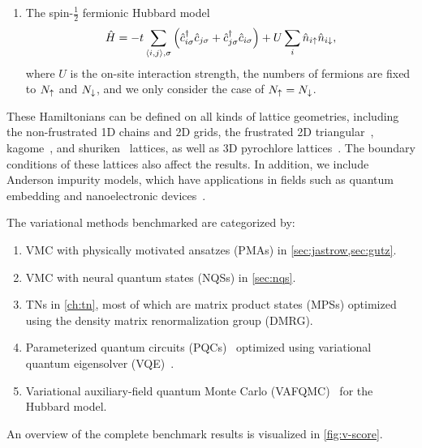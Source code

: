 \begin{enumerate}
\item The spin-$\frac{1}{2}$ fermionic Hubbard model
\begin{equation}
\hat{H} = -t \sum_{\langle i, j \rangle, \sigma} \left( \hat{c}^\dagger_{i \sigma} \hat{c}_{j \sigma} + \hat{c}^\dagger_{j \sigma} \hat{c}_{i \sigma} \right)
+ U \sum_i \hat{n}_{i {\uparrow}} \hat{n}_{i {\downarrow}},
\end{equation}
where $U$ is the on-site interaction strength, the numbers of fermions are fixed to $N_{\uparrow}$ and $N_{\downarrow}$, and we only consider the case of $N_{\uparrow} = N_{\downarrow}$.
\end{enumerate}
These Hamiltonians can be defined on all kinds of lattice geometries, including the non-frustrated 1D chains and 2D grids, the frustrated 2D triangular~\cite{li2015rare, liu2020intrinsic}, kagome~\cite{norman2016colloquium}, and shuriken~\cite{siddharthan2001square, astrakhantsev2021pinwheel} lattices, as well as 3D pyrochlore lattices~\cite{moessner1998properties, astrakhantsev2021broken}. The boundary conditions of these lattices also affect the results. In addition, we include Anderson impurity models, which have applications in fields such as quantum embedding and nanoelectronic devices~\cite{anderson1961localized, kanamori1963electron, lu2019natural, cao2021tree, cao2024vision}.

The variational methods benchmarked are categorized by:
\begin{enumerate}
\item VMC with physically motivated ansatzes (PMAs) in \cref{sec:jastrow,sec:gutz}.
\item VMC with neural quantum states (NQSs) in \cref{sec:nqs}.
\item TNs in \cref{ch:tn}, most of which are matrix product states (MPSs) optimized using the density matrix renormalization group (DMRG).
\item Parameterized quantum circuits (PQCs)~\cite{cerezo2021variational, wecker2015progress} optimized using variational quantum eigensolver (VQE)~\cite{peruzzo2014variational, seki2020symmetry, astrakhantsev2023phenomenological}.
\item Variational auxiliary-field quantum Monte Carlo (VAFQMC)~\cite{sorella2021phase} for the Hubbard model.
\end{enumerate}

An overview of the complete benchmark results is visualized in \cref{fig:v-score}.

\newpage

